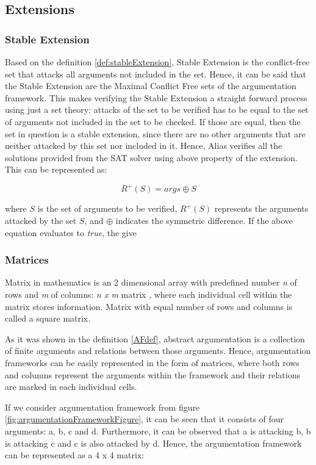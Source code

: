 \subsection{Extensions}
\subsubsection{Stable Extension}
Based on the definition \ref{def:stableExtension}, Stable Extension is the conflict-free set that attacks all arguments not included in the set. Hence, it can be said that the Stable Extension are the Maximal Conflict Free sets of the argumentation framework. This makes verifying the Stable Extension a straight forward process using just a set theory: attacks of the set to be verified has to be equal to the set of arguments not included in the set to be checked. If those are equal, then the set in question is a stable extension, since there are no other arguments that are neither attacked by this set nor included in it. Hence, Alias verifies all the solutions provided from the SAT solver using above property of the extension. This can be represented as: 

\begin{equation}
R^+(S) = args \oplus S
\end{equation}

where $S$ is the set of arguments to be verified, $R^+(S)$ represents the arguments attacked by the set $S$, and $\oplus$ indicates the symmetric difference. If the above equation evaluates to \textit{true}, the give

\subsubsection{Matrices}
Matrix in mathematics is an 2 dimensional array with predefined number \textit{n} of rows and \textit{m} of columns: \textit{n x m} matrix \citep{matrices}, where each individual cell within the matrix stores information. Matrix with equal number of rows and columns is called a square matrix. 

As it was shown in the definition \ref{AFdef}, abstract argumentation is a collection of finite arguments and relations between those arguments. Hence, argumentation frameworks can be easily represented in the form of matrices, where both rows and columns represent the arguments within the framework and their relations are marked in each individual cells. 

If we consider argumentation framework from figure \ref{fig:argumentationFrameworkFigure}, it can be seen that it consists of four arguments: a, b, c and d. Furthermore, it can be observed that a is attacking b, b is attacking c and c is also attacked by d. Hence, the argumentation framework can be represented as a 4 x 4 matrix:


